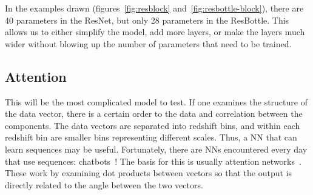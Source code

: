 In the examples drawn (figures~\ref{fig:resblock} and~\ref{fig:resbottle-block}), there are 40 parameters in the ResNet, but only 28 parameters in the ResBottle. This allows us to either simplify the model, add more layers, or make the layers much wider without blowing up the number of parameters that need to be trained.
\subsection{Attention}
This will be the most complicated model to test. If one examines the structure of the data vector, there is a certain order to the data and correlation between the components. The data vectors are separated into redshift bins, and within each redshift bin are smaller bins representing different scales. Thus, a NN that can learn sequences may be useful. Fortunately, there are NNs encountered every day that use sequences: chatbots~\cite{ruby_how_2023}! The basis for this is usually attention networks~\cite{vaswani_attention_2017}. These work by examining dot products between vectors so that the output is directly related to the angle between the two vectors.

